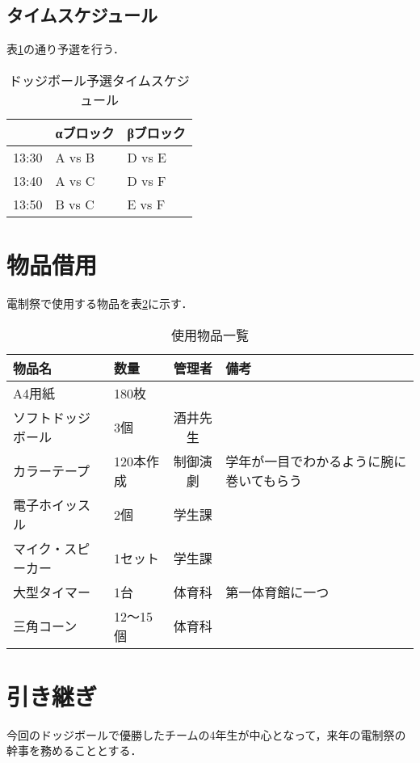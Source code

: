 \documentclass[dvipdfmx]{jsarticle}
\begin{document}
\subsection{タイムスケジュール}
表\ref{block}の通り予選を行う．
\begin{table}[H]
  \caption{ドッジボール予選タイムスケジュール}
  \label{block}
  \centering
  \begin{tabular}{l|ll}
          & αブロック  & βブロック  \\\hline\hline
    13:30 & A vs B & D vs E \\
    13:40 & A vs C & D vs F \\
    13:50 & B vs C & E vs F
  \end{tabular}
\end{table}

\section{物品借用}
電制祭で使用する物品を表\ref{buppin}に示す．
\begin{table}[H]
  \caption{使用物品一覧}
  \label{buppin}
  \centering
  \begin{tabular}{l|lcl}
    物品名       & 数量     & 管理者  & 備考                   \\\hline\hline
    A4用紙      & 180枚   &      &                      \\
    ソフトドッジボール & 3個     & 酒井先生 &                      \\
    カラーテープ    & 120本作成 & 制御演劇 & 学年が一目でわかるように腕に巻いてもらう \\
    電子ホイッスル   & 2個     & 学生課  &                      \\
    マイク・スピーカー & 1セット   & 学生課  &                      \\
    大型タイマー    & 1台     & 体育科  & 第一体育館に一つ             \\
    三角コーン     & 12～15個 & 体育科  &
  \end{tabular}
\end{table}

\section{引き継ぎ}
今回のドッジボールで優勝したチームの4年生が中心となって，来年の電制祭の幹事を務めることとする．
\end{document}
